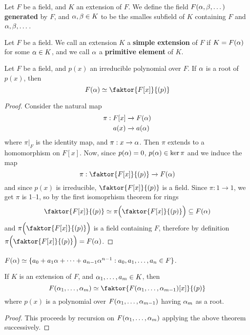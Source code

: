 \begin{definition}
  Let $F$ be a field, and $K$ an extension of $F$. We define the field
  $F(\alpha,\beta, \dots)$ \textbf{generated} by $F$, and $\alpha,\beta \in K$ to be
  the smalles subfield of $K$ containing $F$ and $\alpha,\beta,\dots$.
\end{definition}

\begin{definition}
  Let $F$ be a field. We call an extension $K$ a \textbf{simple
  extension} of $F$ if  $K=F(\alpha)$ for some $\alpha \in K$, and we call
  $\alpha$ a \textbf{primitive element} of $K$.
\end{definition}

\begin{theorem}\label{theorem_8.1.8}
  Let $F$ be a field, and $p(x)$ an irreducible polynomial over $F$.
  If $\alpha$ is a root of $p(x)$, then
  \begin{equation*}
    F(\a) \simeq \faktor{F[x]}{(p)}
  \end{equation*}
\end{theorem}
\begin{proof}
  Consider the natural map
  \begin{align*}
    \pi: F[x] & \xrightarrow{} F(\alpha)  \\
      a(x)  & \xrightarrow{} a(\alpha)  \\
  \end{align*}
  where $\pi|_F$ is the identity map, and  $\pi:x \xrightarrow{} \alpha$.
  Then $\pi$ extends to a homomorphism on $F[x]$. Now, since
  $p(\alpha)=0$, $p(\alpha) \in \ker{\pi}$ and we induce the map
  \begin{equation*}
    \pi:\faktor{F[x]}{(p)} \xrightarrow{} F(\a)
  \end{equation*}
  and since $p(x)$ is irreducible, $\faktor{F[x]}{(p)}$ is a field.
  Since $\pi:1 \xrightarrow{} 1$, we get $\pi$ is 1--1, so by the
  first isomoprhism theorem for rings
  \begin{equation*}
    \faktor{F[x]}{(p)} \simeq \pi\Big{(}\faktor{F[x]}{(p)}\Big{)} \subseteq F(\a)
  \end{equation*}
  and $\pi\Big{(}\faktor{F[x]}{(p)}\Big{)}$ is a field containing $F$, therefore
  by definition $\pi\Big{(}\faktor{F[x]}{(p)}\Big{)}=F(\a)$.
\end{proof}
\begin{corollary}
  $F(\alpha) \simeq \{a_0+a_1\alpha+\dots+a_{n-1}\alpha^{n-1}: a_0,a_1, \dots, a_n
  \in F\}$.
\end{corollary}
\begin{corollary}
  If $K$ is an extension of $F$, and  $\alpha_1, \dots, a_m \in K$, then
  \begin{equation*}
    F(\a_1, \dots, \a_m) \simeq \faktor{F(\a_1, \dots, \a_{m-1})[x]}{(p)}
  \end{equation*}
  where $p(x)$ is a polynomial over $F(\alpha_1, \dots, \alpha_{m-1})$ having
  $\alpha_m$ as a root.
\end{corollary}
\begin{proof}
  This proceeds by recursion on $F(\alpha_1, \dots, \alpha_m)$ applying the
  above theorem successively.
\end{proof}

